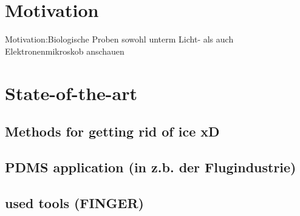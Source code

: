 \section{Motivation}
Motivation:Biologische Proben sowohl unterm Licht- als auch Elektronenmikroskob anschauen

\section{State-of-the-art}

\subsection{Methods for getting rid of ice xD}

\subsection{PDMS application (in z.b. der Flugindustrie)}

\subsection{used tools (FINGER)}


